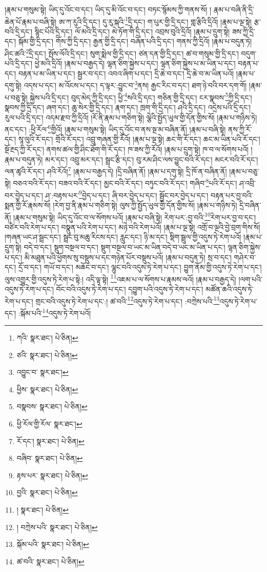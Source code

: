 །རྣམ་པ་གསུམ་སྟེ། ཡིད་དུ་འོང་བ་དང་། ཡིད་དུ་མི་འོང་བ་དང་། བཏང་སྙོམས་ཀྱི་གནས་སོ། །
རྣམ་པ་བཞི་ནི་དྲི་ཆེན་པོ་རྣམ་པ་བཞི་སྟེ། ཨ་ཀ་རུའི་དྲི་དང་། དུ་རུ་སྐའི་\footnote{ཀའི་  སྣར་ཐང་།  པེ་ཅིན། }དྲི་དང་། ག་པུར་གྱི་དྲི་དང་། གླ་རྩིའི་དྲིའོ། །རྣམ་པ་ལྔ་སྟེ། རྩ་བའི་དྲི་དང་། སྙིང་པོའི་དྲི་དང་། ལོ་མའི་དྲི་དང་། མེ་ཏོག་གི་དྲི་དང་། འབྲས་བུའི་དྲིའོ། །རྣམ་པ་དྲུག་སྟེ། ཟས་ཀྱི་དྲི་དང་། སྐོམ་གྱི་དྲི་དང་། གོས་ཀྱི་དྲི་དང་། རྒྱན་གྱི་དྲི་དང་། བཞོན་པའི་དྲི་དང་། གནས་ཀྱི་དྲིའོ། །རྣམ་པ་བདུན་ཏེ། ཤིང་ཚའི་\footnote{ཙའི་  སྣར་ཐང་།  པེ་ཅིན། }དྲི་དང་། སྤོས་ལོའི་དྲི་དང་། སུག་སྨེལ་གྱི་དྲི་དང་། ཙན་དན་གྱི་དྲི་དང་། ཚ་བ་གསུམ་གྱི་དྲི་དང་། བདུག་པའི་དྲི་དང་། ཕྱེ་མའི་དྲིའོ། །རྣམ་པ་བརྒྱད་དེ། ལྷན་ཅིག་སྐྱེས་པ་དང་། ལྷན་ཅིག་སྐྱེས་པ་མ་ཡིན་པ་དང་། བརྟན་པ་དང་། བརྟན་པ་མ་ཡིན་པ་དང་། སྦྱར་བ་དང་། འབའ་ཞིག་པ་དང་། དྲི་ཆེ་བ་དང་། དྲི་ཆེ་བ་མ་ཡིན་པའོ། །རྣམ་པ་དགུ་སྟེ། འདས་པ་དང་། མ་འོངས་པ་དང་། ད་ལྟར་:བྱུང་བ་\footnote{འབྱུང་བ་  སྣར་ཐང་། }ནས། རྒྱང་རིང་བ་དང་། ཐག་ཉེ་བའི་བར་དག་གོ། །རྣམ་པ་བཅུ་སྟེ། སྐྱེས་པའི་དྲི་དང་། བུད་མེད་ཀྱི་དྲི་དང་། ཕྱི་\footnote{ཕྱིས་  སྣར་ཐང་།  པེ་ཅིན། }སའི་དྲི་དང་། གཅིན་གྱི་དྲི་དང་། ངར་སྣབས་\footnote{བསྣབས་  སྣར་ཐང་།  པེ་ཅིན། }ཀྱི་དྲི་དང་། སྣབས་ཀྱི་དྲི་དང་། ཞག་དང་། ཆུ་སེར་གྱི་དྲི་དང་། རྣག་དང་། ཁྲག་གི་དྲི་དང་། ཤའི་དྲི་དང་། འདྲེས་པའི་དྲི་དང་། རུལ་པའི་དྲི་དང་། འདམ་རྫབ་ཀྱི་དྲིའོ། །རོ་ནི་རྣམ་པ་གཅིག་སྟེ། ལྕེའི་སྤྱོད་ཡུལ་གྱི་དོན་གྱིས་སོ། །རྣམ་པ་གཉིས་ཏེ། ནང་དང་། :ཕྱི་རོལ་\footnote{ཕྱི་རོལ་གྱི་རོལ་  སྣར་ཐང་། }གྱིའོ། །རྣམ་པ་གསུམ་སྟེ། ཡིད་དུ་འོང་བ་ནས་སྔ་མ་བཞིན་ནོ། །རྣམ་པ་བཞི་སྟེ། ནས་ཀྱི་རོ་དང་། སཱ་ལུའི་རོ་དང་། གྲོའི་རོ་དང་། འབྲུ་གཞན་གྱི་རོའོ། །རྣམ་པ་ལྔ་སྟེ། ཆང་གི་རོ་དང་། ཆང་མ་ཡིན་པའི་རོ་དང་། སྔོ་རྔད་ཀྱི་རོ་དང་། ནགས་ཚལ་གྱི་ཤིང་ཐོག་གི་རོ་དང་། ཁ་ཟས་ཀྱི་རོའོ། །རྣམ་པ་དྲུག་སྟེ། ཁ་བ་ལ་སོགས་པའོ། །རྣམ་པ་བདུན་ཏེ། མར་དང་། འབྲུ་མར་དང་། སྦྲང་རྩི་དང་། བུ་རམ་ཤིང་ལས་བྱུང་བའི་རོ་དང་། མངར་བའི་རོ་དང་། ལན་ཚྭའི་རོ་དང་། ཤའི་རོའོ།\footnote{རོ་དང་།  སྣར་ཐང་།  པེ་ཅིན། } །རྣམ་པ་བརྒྱད་དེ། །དྲི་བཞིན་ནོ། །རྣམ་པ་དགུ་སྟེ། དྲི་ཁོ་ན་བཞིན་ནོ། །རྣམ་པ་བཅུ་སྟེ། བཅའ་བའི་རོ་དང་། བཟའ་བའི་རོ་དང་། མྱང་བའི་རོ་དང་། བཏུང་བའི་རོ་དང་། གཞིབ་\footnote{བཞིབ་  སྣར་ཐང་།  པེ་ཅིན། }པའི་རོ་དང་། ཤ་འབྲི་བར་བྱེད་པ་དང་། ཤ་:བརྟས་པར་\footnote{རྟས་པར་  སྣར་ཐང་།  པེ་ཅིན། }བྱེད་པ་དང་། ཞི་བར་བྱེད་པ་དང་། སྦྱོང་བར་བྱེད་པ་དང་། བརྟན་པར་བྱ་བའི་སྨན་གྱི་རོ་རྣམས་སོ། །རེག་བྱ་ནི་རྣམ་པ་གཅིག་སྟེ། ལུས་ཀྱི་སྤྱོད་ཡུལ་གྱི་དོན་གྱིས་སོ། །རྣམ་པ་གཉིས་ཏེ། དྲི་བཞིན་ནོ། །རྣམ་པ་གསུམ་སྟེ། ཡིད་དུ་འོང་བ་ལ་སོགས་པའོ། །རྣམ་པ་བཞི་སྟེ། རེག་པར་:བྱ་བའི་\footnote{བྱའི་  སྣར་ཐང་།  པེ་ཅིན། }རེག་པར་བྱ་བ་དང་། བཙིར་བའི་རེག་པ་དང་། བསྣུན་པའི་རེག་པ་དང་། མཉེ་བའི་རེག་པའོ། །རྣམ་པ་ལྔ་སྟེ། འགྲོ་བ་ལྔའི་བྱེ་བྲག་གིས་སོ། །གཞན་ཡང་ཤ་སྦྲང་དང་། སྦྲང་བུ་མཆུ་རིངས་དང་། རླུང་དང་། ཉི་མ་དང་། སྡིག་སྦྲུལ་གྱི་འདུས་ཏེ་རེག་པའོ། །རྣམ་པ་དྲུག་སྟེ། བདེ་བ་དང་། སྡུག་བསྔལ་བ་དང་། སྡུག་བསྔལ་བ་ཡང་མ་ཡིན་བདེ་བ་ཡང་མ་ཡིན་པ་དང་། ལྷན་ཅིག་སྐྱེས་པ་དང་། མི་མཐུན་པའི་ཕྱོགས་སུ་བསྡུས་པ་དང་གཉེན་པོར་བསྡུས་པའོ། །རྣམ་པ་བདུན་ཏེ། སྲ་བ་དང་། གཤེར་བ་དང་། དྲོ་བ་དང་། གཡོ་བ་དང་། མཆོང་བ་དང་། ལྷུང་བའི་འདུས་ཏེ་རེག་པ་དང་། བྱུག་ནོམ་གྱི་འདུས་ཏེ་རེག་པ་དང་། ལུས་འགྱུར་གྱི་འདུས་ཏེ་རེག་པ་སྟེ:། འདི་ལྟ་སྟེ། \footnote{།    སྣར་ཐང་།  པེ་ཅིན། }འཇམ་པ་ལ་སོགས་པ་རྣམས་ལའོ། །རྣམ་པ་བརྒྱད་དེ། །ལག་པའི་འདུས་ཏེ་རེག་པ་དང་། བོང་བའི་འདུས་ཏེ་རེག་པ་དང་། དབྱུག་པའི་འདུས་ཏེ་རེག་པ་དང་། མཚོན་ཆའི་འདུས་ཏེ་རེག་པ་དང་། གྲང་བའི་འདུས་ཏེ་རེག་པ་དང་:། ཚ་བའི་\footnote{།  བཀྲེས་པའི་  སྣར་ཐང་།  པེ་ཅིན། }འདུས་ཏེ་རེག་པ་དང་། :བཀྲེས་པའི་\footnote{སྐོམ་པའི་  སྣར་ཐང་།  པེ་ཅིན། }འདུས་ཏེ་རེག་པ་དང་། :སྐོམ་པའི་\footnote{ཚ་བའི་  སྣར་ཐང་།  པེ་ཅིན། }འདུས་ཏེ་རེག་པའོ། 